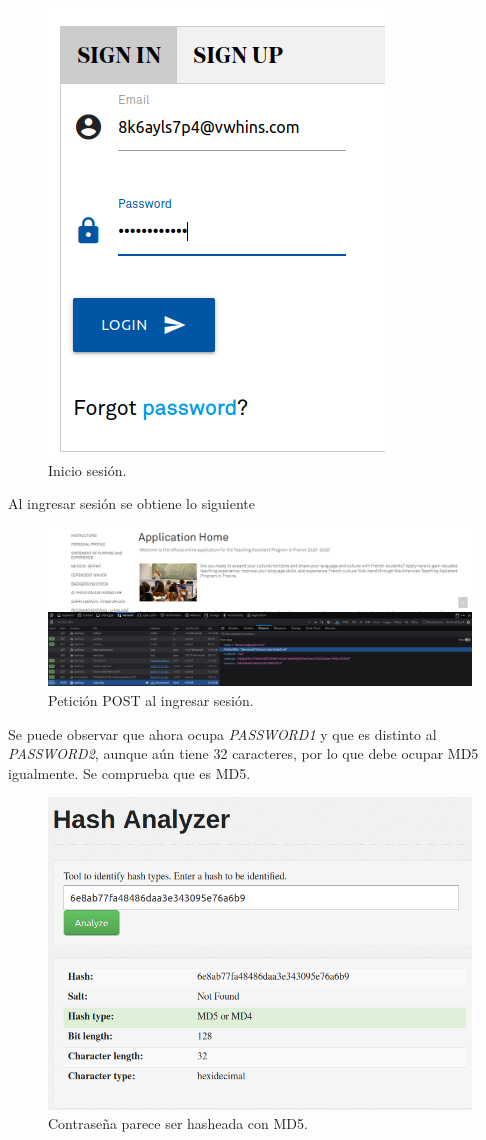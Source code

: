 \documentclass[letter,12pt]{article}
\begin{document}
\begin{figure}[H]
            \centering
            \includegraphics[width=0.3\linewidth]{iniciosesion.png}
        \caption{\label{fig:5} Inicio sesión.}
    \end{figure}

Al ingresar sesión se obtiene lo siguiente

\begin{figure}[H]
            \centering
            \includegraphics[width=1.5\linewidth]{resultadologin.png}
        \caption{\label{fig:6} Petición POST al ingresar sesión.}
    \end{figure}

Se puede observar que ahora ocupa \textit{PASSWORD1} y que es distinto al \textit{PASSWORD2}, aunque aún tiene 32 caracteres, por lo que debe ocupar MD5 igualmente. Se comprueba que es MD5.

\begin{figure}[H]
            \centering
            \includegraphics[width=0.5\linewidth]{hashanalyzer1.png}
        \caption{\label{fig:7} Contraseña parece ser hasheada con MD5.}
    \end{figure}
\end{document}
